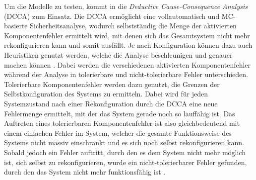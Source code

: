 Um die Modelle zu testen, kommt in \sS die \textit{Deductive Cause-Consequence Analysis} (DCCA) zum Einsatz. Die DCCA ermöglicht eine vollautomatisch und MC-basierte Sicherheitsanalyse, wodurch selbstständig die Menge der aktivierten Komponentenfehler ermittelt wird, mit denen sich das Gesamtsystem nicht mehr rekonfigurieren kann und somit ausfällt. Je nach Konfiguration können dazu auch Heuristiken genutzt werden, welche die Analyse beschleunigen und genauer machen können \cite{Eberhardinger2016}. Dabei werden die verschiedenen aktivierten Komponentenfehler während der Analyse in tolerierbare und nicht-tolerierbare Fehler unterschieden. Tolerierbare Komponentenfehler werden dazu genutzt, die Grenzen der Selbstkonfiguration des Systems zu ermitteln. Dabei wird für jeden Systemzustand nach einer Rekonfiguration durch die DCCA eine neue Fehlermenge ermittelt, mit der das System gerade noch so lauffähig ist. Das Auftreten eines tolerierbaren Komponentenfehler ist also gleichbedeutend mit einem einfachen Fehler im System, welcher die gesamte Funktionsweise des Systems nicht massiv einschränkt und es sich noch selbst rekonfigurieren kann. Sobald jedoch ein Fehler auftritt, durch den es dem System nicht mehr möglich ist, sich selbst zu rekonfigurieren, wurde ein nicht-tolerierbarer Fehler gefunden, durch den das System nicht mehr funktionsfähig ist \cite{Habermaier2015}.